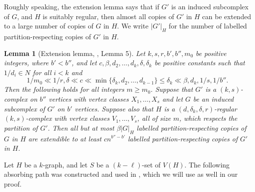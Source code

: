 \documentclass[11pt, reqno]{amsart}    	%
\newtheorem{lemma}[thm]{Lemma}
\theoremstyle{definition}
\numberwithin{equation}{section}
\begin{document}
\begin{appendix}
		Roughly speaking, the extension lemma says that if $G'$ is an induced subcomplex of $G$, and $H$ is suitably regular, then almost all copies of $G'$ in $H$ can be extended to a large number of copies of $G$ in $H$. We write $|G'|_{H}$ for the number of labelled partition-respecting copies of $G'$ in $H$.
		
		
		\begin{lemma}[Extension lemma, \cite{Cooley2009Embeddings}, Lemma 5]\label{exten lem}
			Let $k,s,r,b',b'',m_{0}$ be positive integers, where	$b'<b''$, and let $c,\beta,d_{2} ,\dots, d_{k},\delta,\delta_{k}$ be positive constants such that $1/d_{i} \in N$ for all $i < k$ and
			\[1/m_{0} \ll 1/r, \delta \ll c \ll \min\{\delta_{k}, d_{2} ,\dots, d_{k-1}\} \le \delta_{k} \ll \beta, d_{k}, 1/s, 1/b''.\]
			Then the following holds for all integers $m\ge m_{0}$. Suppose that $G'$
			is a $(k,s)$-complex on $b''$ vertices with vertex classes $X_{1}, \dots, X_{s}$ and let $G$ be an induced subcomplex of 
			$G'$ on $b'$ vertices.	Suppose also that $H$ is a  $(d,\delta_{k},\delta,r)$-regular  $(k,s)$-complex with vertex classes $V_{1},\dots,V_{s}$, all of size $m$, which respects the partition of $G'$. Then all but at most $\beta |G|_{H}$ labelled partition-respecting copies of $G$ in $H$ are extendible to at least $cn^{b''-b'}$ labelled partition-respecting copies	of $G'$ in $H$.	
		\end{lemma}
		
		Let $H$ be a $k$-graph, and let $S$ be a $( k-\ell) $-set of $V(H)$. 
		The following absorbing path was constructed and used in \cite{Daniela2010Hamilton}, which we will use as well in our proof.
		

\end{appendix}
\end{document}
